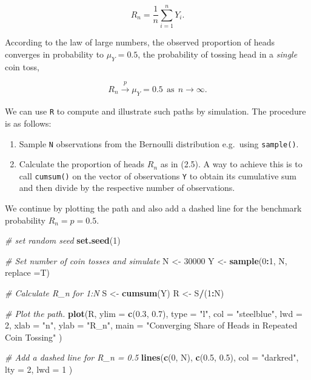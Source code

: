 \documentclass[]{book}
\newenvironment{Shaded}{\begin{snugshade}}{\end{snugshade}}
\newcommand{\KeywordTok}[1]{\textcolor[rgb]{0.13,0.29,0.53}{\textbf{#1}}}
\newcommand{\DataTypeTok}[1]{\textcolor[rgb]{0.13,0.29,0.53}{#1}}
\newcommand{\DecValTok}[1]{\textcolor[rgb]{0.00,0.00,0.81}{#1}}
\newcommand{\FloatTok}[1]{\textcolor[rgb]{0.00,0.00,0.81}{#1}}
\newcommand{\StringTok}[1]{\textcolor[rgb]{0.31,0.60,0.02}{#1}}
\newcommand{\CommentTok}[1]{\textcolor[rgb]{0.56,0.35,0.01}{\textit{#1}}}
\newcommand{\OperatorTok}[1]{\textcolor[rgb]{0.81,0.36,0.00}{\textbf{#1}}}
\newcommand{\NormalTok}[1]{#1}
\providecommand{\tightlist}{%
  \setlength{\itemsep}{0pt}\setlength{\parskip}{0pt}}
\theoremstyle{definition}
\theoremstyle{definition}
\theoremstyle{definition}
\theoremstyle{remark}
\begin{document}
\[ R_n = \frac{1}{n} \sum_{i=1}^n Y_i. \tag{2.5}\]

According to the law of large numbers, the observed proportion of heads
converges in probability to \(\mu_Y = 0.5\), the probability of tossing
head in a \emph{single} coin toss,

\[ R_n \xrightarrow[]{p} \mu_Y=0.5 \ \ \text{as} \ \ n \rightarrow \infty.  \]

We can use \texttt{R} to compute and illustrate such paths by
simulation. The procedure is as follows:

\begin{enumerate}
\def\labelenumi{\arabic{enumi}.}
\tightlist
\item
  Sample \texttt{N} observations from the Bernoulli distribution
  e.g.~using \texttt{sample()}.
\item
  Calculate the proportion of heads \(R_n\) as in (2.5). A way to
  achieve this is to call \texttt{cumsum()} on the vector of
  observations \texttt{Y} to obtain its cumulative sum and then divide
  by the respective number of observations.
\end{enumerate}

We continue by plotting the path and also add a dashed line for the
benchmark probability \(R_n = p = 0.5\).

\begin{Shaded}
\begin{Highlighting}[]
\CommentTok{# set random seed}
\KeywordTok{set.seed}\NormalTok{(}\DecValTok{1}\NormalTok{)}

\CommentTok{# Set number of coin tosses and simulate}
\NormalTok{N <-}\StringTok{ }\DecValTok{30000}
\NormalTok{Y <-}\StringTok{ }\KeywordTok{sample}\NormalTok{(}\DecValTok{0}\OperatorTok{:}\DecValTok{1}\NormalTok{, N, }\DataTypeTok{replace =}\NormalTok{T)}

\CommentTok{# Calculate R_n for 1:N}
\NormalTok{S <-}\StringTok{ }\KeywordTok{cumsum}\NormalTok{(Y)}
\NormalTok{R <-}\StringTok{ }\NormalTok{S}\OperatorTok{/}\NormalTok{(}\DecValTok{1}\OperatorTok{:}\NormalTok{N)}

\CommentTok{# Plot the path.}
\KeywordTok{plot}\NormalTok{(R, }
     \DataTypeTok{ylim =} \KeywordTok{c}\NormalTok{(}\FloatTok{0.3}\NormalTok{, }\FloatTok{0.7}\NormalTok{), }
     \DataTypeTok{type =} \StringTok{"l"}\NormalTok{, }
     \DataTypeTok{col =} \StringTok{"steelblue"}\NormalTok{, }
     \DataTypeTok{lwd =} \DecValTok{2}\NormalTok{, }
     \DataTypeTok{xlab =} \StringTok{"n"}\NormalTok{, }
     \DataTypeTok{ylab =} \StringTok{"R_n"}\NormalTok{,}
     \DataTypeTok{main =} \StringTok{"Converging Share of Heads in Repeated Coin Tossing"}
\NormalTok{     )}

\CommentTok{# Add a dashed line for R_n = 0.5}
\KeywordTok{lines}\NormalTok{(}\KeywordTok{c}\NormalTok{(}\DecValTok{0}\NormalTok{, N), }
      \KeywordTok{c}\NormalTok{(}\FloatTok{0.5}\NormalTok{, }\FloatTok{0.5}\NormalTok{), }
      \DataTypeTok{col =} \StringTok{"darkred"}\NormalTok{, }
      \DataTypeTok{lty =} \DecValTok{2}\NormalTok{, }
      \DataTypeTok{lwd =} \DecValTok{1}
\NormalTok{      )}
\end{Highlighting}
\end{Shaded}
\end{document}
